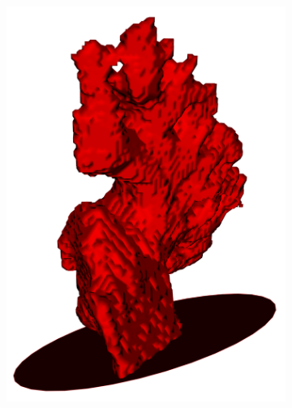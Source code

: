 \documentclass[review]{elsarticle}
\begin{document}
\begin{figure}[t]
  \centering
  \begin{subfigure}[b]{.12\linewidth}
    \centering
    \includegraphics[width=\textwidth]{fig11_1.png}
  \end{subfigure}%
  \begin{subfigure}[b]{.12\linewidth}
    \centering

\end{subfigure}
\end{figure}
\end{document}

